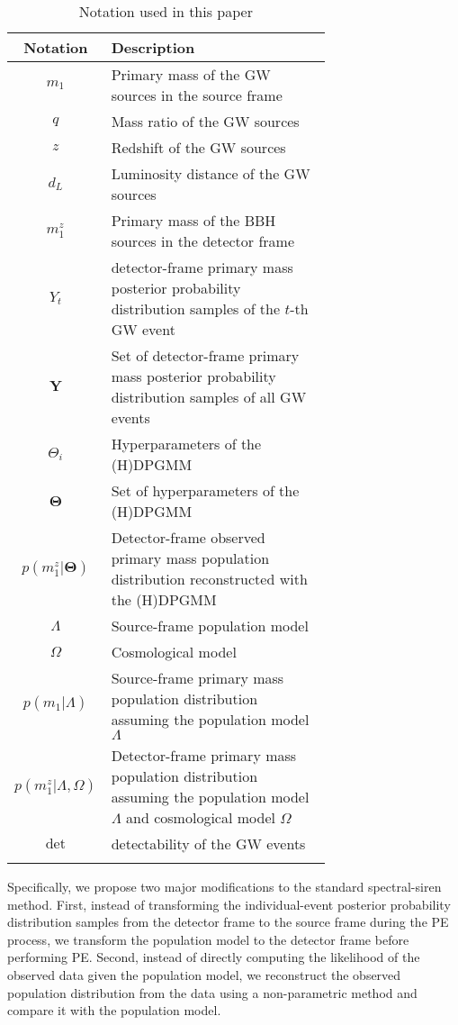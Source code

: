 \documentclass[sn-aps, pdflatex]{sn-jnl}
\begin{document}
\begin{table}[htbp]
    \caption{Notation used in this paper}
    \begin{tabular}{cp{0.7\linewidth}}
        \toprule
        Notation & Description \\
        \midrule
        $m_1$ & Primary mass of the \ac{GW} sources in the source frame \\
        $q$ & Mass ratio of the \ac{GW} sources \\
        $z$ & Redshift of the \ac{GW} sources \\
        $d_L$ & Luminosity distance of the \ac{GW} sources \\
        $m^z_1$ & Primary mass of the \ac{BBH} sources in the detector frame \\
        $Y_t$ & detector-frame primary mass posterior probability distribution samples of the $t$-th \ac{GW} event \\
        $\mathbf{Y}$ & Set of detector-frame primary mass posterior probability distribution samples of all \ac{GW} events \\
        $\Theta_i$ & Hyperparameters of the \ac{(H)DPGMM} \\
        $\mathbf{\Theta}$ & Set of hyperparameters of the \ac{(H)DPGMM} \\
        $p(m^z_1|\mathbf{\Theta})$ & Detector-frame observed primary mass population distribution reconstructed with the \ac{(H)DPGMM} \\
        $\Lambda$ & Source-frame population model \\
        $\Omega$ & Cosmological model \\
        $p(m_1|\Lambda)$ & Source-frame primary mass population distribution assuming the population model $\Lambda$ \\
        $p(m^z_1|\Lambda, \Omega)$ & Detector-frame primary mass population distribution assuming the population model $\Lambda$ and cosmological model $\Omega$ \\
        $\mathrm{det}$ & detectability of the \ac{GW} events \\
        \botrule
    \end{tabular}
    \label{tab:notation}
\end{table}

Specifically, we propose two major modifications to the standard spectral-siren method.
First, instead of transforming the individual-event posterior probability distribution samples from the detector frame to the source frame during the \ac{PE} process, we transform the population model to the detector frame before performing \ac{PE}.
Second, instead of directly computing the likelihood of the observed data given the population model, we reconstruct the observed population distribution from the data using a non-parametric method and compare it with the population model.
\end{document}
